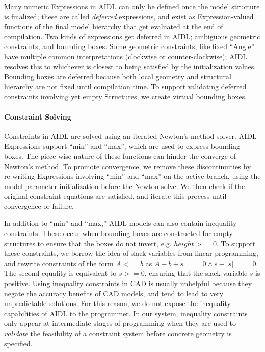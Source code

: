 Many numeric Expressions in AIDL can only be defined once the model structure is finalized; these are called \emph{deferred} expressions, and exist as Expression-valued functions of the final model hierarchy that get evaluated at the end of compilation. Two kinds of expressions get deferred in AIDL; ambiguous geometric constraints, and bounding boxes. Some geometric constraints, like fixed ``Angle'' have multiple common interpretations (clockwise or counter-clockwise); AIDL resolves this to whichever is closest to being satisfied by the initialization values. Bounding boxes are deferred because both local geometry and structural hierarchy are not fixed until compilation time. 
To support validating deferred constraints involving yet empty Structures, we create virtual bounding boxes.

\paragraph{Constraint Solving}
Constraints in AIDL are solved using an iterated Newton's method solver. AIDL Expressions support ``min'' and ``max'', which are used to express bounding boxes. The piece-wise nature of these functions can hinder the converge of Newton's method. 
To promote convergence, we remove these discontinuities by re-writing Expressions involving ``min'' and ``max'' on the active branch, using the model parameter initialization before the Newton solve. 
We then check if the original constraint equations are satisfied, and iterate this process until convergence or failure.

In addition to ``min'' and ``max,'' AIDL models can also contain inequality constraints. 
These occur when bounding boxes are constructed for empty structures to ensure that the boxes do not invert, e.g. $height >= 0$. To support these constraints, we borrow the idea of slack variables from linear programming, and rewrite constraints of the form $A <= b$ as $A - b + s == 0 \land s - |s| == 0$. The second equality is equivalent to $s >= 0$, ensuring that the slack variable $s$ is positive. Using inequality constraints in CAD is usually unhelpful because they negate the accuracy benefits of CAD models, and tend to lead to very unpredictable solutions. For this reason, we do not expose the inequality capabilities of AIDL to the programmer. In our system, inequality constraints only appear at intermediate stages of programming when they are used to \textit{validate} the feasibility of a constraint system before concrete geometry is specified.


